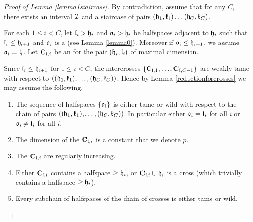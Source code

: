 \begin{proof}[Proof of Lemma \ref{lemma1staircase}]
By contradiction, assume that for any $C$, there exists an interval $\mathcal{I}$ and a staircase of \adjP pairs $(\mathfrak{h}_1, \mathfrak{k}_1)\dots (\mathfrak{h}_C, \mathfrak{k}_C)$. %

For each $1\le i<C$, let $\mathfrak{l}_i > \mathfrak{h}_i$ and $\mathfrak{o}_i > \mathfrak{h}_i$ be halfspaces adjacent to $\mathfrak{h}_i$ such that $\mathfrak{l}_i \leq \mathfrak{h}_{i+1}$ and $\mathfrak{o}_i$ is a \countcer (see Lemma \ref{lemma0}). 
Moreover if $\mathfrak{o}_i \leq \mathfrak{h}_{i+1}$, we assume $\mathfrak{o}_i=\mathfrak{l}_i$. Let $\mathbf{C}_{\mathfrak{l},i}$ be an \intc for the pair $(\mathfrak{h}_i, \mathfrak{l}_i)$ of maximal dimension.

Since $\mathfrak{l}_i\le\mathfrak{h}_{i+1}$ for $1\le i<C$, the intercrosses $\left\{\mathbf{C}_{\mathfrak{l},1},\ldots,\mathbf{C}_{\mathfrak{l},C-1}\right\}$ are weakly tame with respect to $\left((\mathfrak{h}_{1},\mathfrak{k}_{1}),\ldots,(\mathfrak{h}_{C},\mathfrak{k}_{C})\right)$. Hence by Lemma \ref{reductionforcrosses} we may assume the following.
\begin{enumerate}
\item \label{l is o} The sequence of halfspaces $\left\{\mathfrak{o}_i\right\}$ is either tame or wild with respect to the chain of pairs $\left((\mathfrak{h}_{1},\mathfrak{k}_{1}),\ldots,(\mathfrak{h}_{C},\mathfrak{k}_{C})\right)$. %
In particular either $\mathfrak{o}_i = \mathfrak{l}_i$ for all $i$ or $\mathfrak{o}_i \neq  \mathfrak{l}_i$ for all $i$.
\item The dimension of the $\mathbf{C}_{\mathfrak{l},i}$ is a constant that we denote $p$.
\item \label{reginccubes} The $\mathbf{C}_{\mathfrak{l},i}$ are regularly increasing.
\item Either $\mathbf{C}_{\mathfrak{l},i}$ contains a halfspace $\geq \mathfrak{h}_i$, or $\mathbf{C}_{\mathfrak{l},i}\cup \mathfrak{h}_i$ is a cross (which trivially contains a halfspace $\geq \mathfrak{h}_i$).
\item \label{tameorwildcrosses} Every subchain of halfspaces of the chain of crosses is either tame or wild.%
\end{enumerate}


\end{proof}
